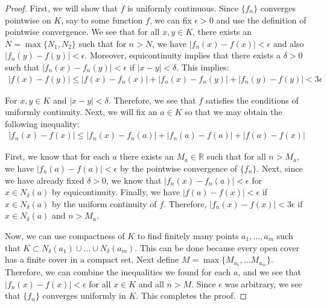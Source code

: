 \documentclass[psamsfonts]{amsart}
\theoremstyle{definition}
\theoremstyle{remark}
\numberwithin{equation}{section}
\begin{document}
\begin{proof}
First, we will show that $f$ is uniformly continuous. Since $\{ f_n \}$ converges pointwise on $K$, say to some function $f$, we can fix $\epsilon > 0$ and use the definition of pointwise convergence. We see that for all $x,y \in K$, there exists an $N = \max\{N_1, N_2 \}$ such that for $n > N$, we have $|f_n(x) - f(x)| < \epsilon$ and also $|f_n(y) - f(y)| < \epsilon$. Moreover, equicontinuity implies that there exists a $\delta > 0$ such that $|f_n(x) - f_n(y)| < \epsilon$ if $|x - y| < \delta$. This implies:
\begin{eqnarray}
|f(x) - f(y)| \leq |f(x) - f_n(x)| + |f_n(x) - f_n(y)| + |f_n(y) - f(y)| < 3 \epsilon
\end{eqnarray} 

For $x,y \in K$ and $| x - y| < \delta$. Therefore, we see that $f$ satisfies the conditions of uniformly continuity. Next, we will fix an $a \in K$ so that we may obtain the following inequality:
\begin{eqnarray}
|f_n(x) - f(x)| \leq |f_n(x) - f_n(a)| + |f_n(a) - f(a)| + |f(a) - f(x)|
\end{eqnarray}

First, we know that for each $a$ there exists an $M_a \in \mathbb{R}$ such that for all $n > M_a$, we have $|f_n(a) - f(a)| < \epsilon$ by the pointwise convergence of $\{ f_n \}$. Next, since we have already fixed $\delta > 0$, we know that $|f_n(x) - f_n(a)| < \epsilon$ for $x \in N_\delta(a)$ by equicontinuity. Finally, we have $|f(a) - f(x)| < \epsilon$ if $x \in N_\delta(a)$ by the uniform continuity of $f$. Therefore, $|f_n(x) - f(x)| < 3\epsilon$ if $x \in N_\delta(a)$ and $n > M_a$.

Now, we can use compactness of $K$ to find finitely many points $a_1, \ldots, a_m$ such that $K \subset N_\delta(a_1) \cup \ldots \cup N_\delta(a_m)$. This can be done because every open cover has a finite cover in a compact set. Next define $M = \max\{ M_{a_1}, \ldots M_{a_m} \}$. Therefore, we can combine the inequalities we found for each $a$, and we see that $|f_n(x) - f(x)| < \epsilon$ for all $x \in K$ and all $n > M$. Since $\epsilon$ was arbitrary, we see that $\{ f_n \}$ converges uniformly in $K$. This completes the proof.
\end{proof}
\end{document}
